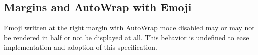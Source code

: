 \documentclass{article}
\begin{document}
\subsection{Margins and AutoWrap with Emoji}

Emoji written at the right margin with AutoWrap mode disabled
may or may not be rendered in half or not be displayed at all.
This behavior is undefined to ease implementation and adoption 
of this specification.


\printbibliography[title={References}]
\end{document}
